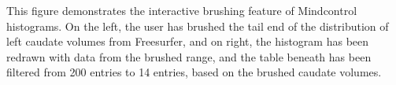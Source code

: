 \label{fig:brush}
This figure demonstrates the interactive brushing feature of Mindcontrol histograms. On the left, the user has brushed the tail end of the distribution of left caudate volumes from Freesurfer, and on right, the histogram has been redrawn with data from the brushed range, and the table beneath has been filtered from 200 entries to 14 entries, based on the brushed caudate volumes.